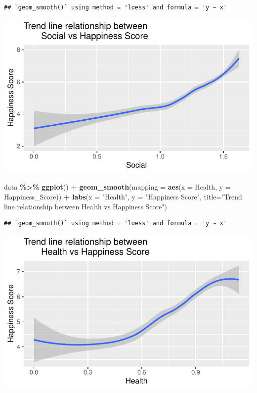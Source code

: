 \documentclass[
  11pt,
]{article}
\newenvironment{Shaded}{\begin{snugshade}}{\end{snugshade}}
\newcommand{\AttributeTok}[1]{\textcolor[rgb]{0.13,0.29,0.53}{#1}}
\newcommand{\FunctionTok}[1]{\textcolor[rgb]{0.13,0.29,0.53}{\textbf{#1}}}
\newcommand{\NormalTok}[1]{#1}
\newcommand{\SpecialCharTok}[1]{\textcolor[rgb]{0.81,0.36,0.00}{\textbf{#1}}}
\newcommand{\StringTok}[1]{\textcolor[rgb]{0.31,0.60,0.02}{#1}}
\begin{document}
\begin{verbatim}
## `geom_smooth()` using method = 'loess' and formula = 'y ~ x'
\end{verbatim}

\begin{center}\includegraphics[width=0.7\linewidth]{Group_project_2_files/figure-latex/unnamed-chunk-10-1} \end{center}

\begin{Shaded}
\begin{Highlighting}[]
\NormalTok{data }\SpecialCharTok{\%\textgreater{}\%}
  \FunctionTok{ggplot}\NormalTok{() }\SpecialCharTok{+}
  \FunctionTok{geom\_smooth}\NormalTok{(}\AttributeTok{mapping =} \FunctionTok{aes}\NormalTok{(}\AttributeTok{x =}\NormalTok{ Health, }\AttributeTok{y =}\NormalTok{ Happiness\_Score)) }\SpecialCharTok{+}
  \FunctionTok{labs}\NormalTok{(}\AttributeTok{x =} \StringTok{"Health"}\NormalTok{, }\AttributeTok{y =} \StringTok{"Happiness Score"}\NormalTok{, }
       \AttributeTok{title=}\StringTok{"Trend line relationship between }
\StringTok{       Health vs Happiness Score"}\NormalTok{)}
\end{Highlighting}
\end{Shaded}

\begin{verbatim}
## `geom_smooth()` using method = 'loess' and formula = 'y ~ x'
\end{verbatim}

\begin{center}\includegraphics[width=0.7\linewidth]{Group_project_2_files/figure-latex/unnamed-chunk-11-1} \end{center}
\end{document}
